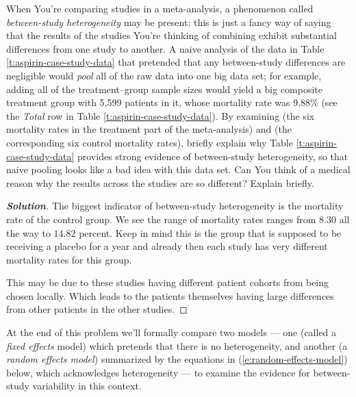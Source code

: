 \documentclass[12pt]{article}
\newenvironment{solution}{\begin{tcolorbox}[breakable]\begin{proof}[\textbf{\textit{Solution}}] }{\end{proof}\end{tcolorbox}}
\begin{document}
\begin{itemize}
\textit{} \vspace*{0.025in} When You're comparing studies in a meta-analysis, a phenomenon called \textit{between-study heterogeneity} may be present: this is just a fancy way of saying that the results of the studies You're thinking of combining exhibit substantial differences from one study to another. A naive analysis of the data in Table \ref{t:aspirin-case-study-data} that pretended that any between-study differences are negligible would \textit{pool} all of the raw data into one big data set; for example, adding all of the treatment--group sample sizes would yield a big composite treatment group with 5,599 patients in it, whose mortality rate was 9.88\% (see the \textit{Total} row in Table \ref{t:aspirin-case-study-data}). By examining (the six mortality rates in the treatment part of the meta-analysis) and (the corresponding six control mortality rates), briefly explain why Table \ref{t:aspirin-case-study-data} provides strong evidence of between-study heterogeneity, so that naive pooling looks like a bad idea with this data set. Can You think of a medical reason why the results across the studies are so different? Explain briefly. \textit{\fbox{\textbf{[10 points]}}}

\begin{solution}
    The biggest indicator of between-study heterogeneity is the mortality rate of the control group. We see the range of mortality rates ranges from $8.30$ all the way to $14.82$ percent. Keep in mind this is the group that is supposed to be receiving a placebo for a year and already then each study has very different mortality rates for this group. 

    This may be due to these studies having different patient cohorts from being chosen locally. Which leads to the patients themselves having large differences from other patients in the other studies. 
\end{solution}

\end{itemize}

At the end of this problem we'll formally compare two models --- one (called a \textit{fixed effects} model) which pretends that there is no heterogeneity, and another (a \textit{random effects model}) summarized by the equations in (\ref{e:random-effects-model}) below, which acknowledges heterogeneity --- to examine the evidence for between-study variability in this context.
\end{document}

